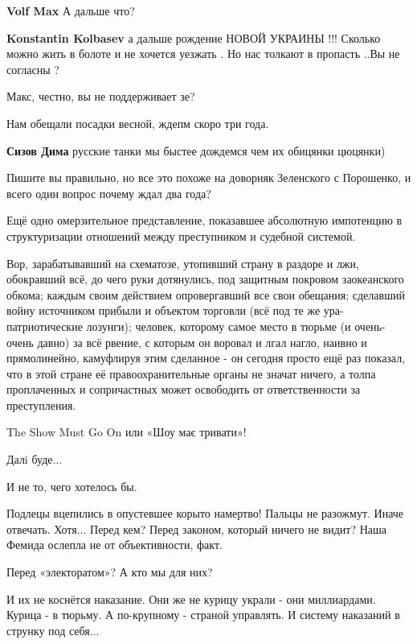 \begin{itemize}
\begin{itemize} %
\textbf{Volf Max} А дальше что?

\textbf{Konstantin Kolbasev} а дальше рождение НОВОЙ УКРАИНЫ !!! Сколько можно жить в болоте и не хочется уезжать . Но нас толкают в пропасть ..Вы не согласны ?
\end{itemize} %

Макс, честно, вы не поддерживает зе?

Нам обещали посадки весной, ждепм скоро три года.

\textbf{Сизов Дима} русские танки мы быстее дождемся чем их обицянки цюцянки)

Пишите вы правильно, но все это похоже на доворняк Зеленского с Порошенко, и
всего один вопрос почему ждал два года?


Ещё одно омерзительное представление, показавшее абсолютную импотенцию в
структуризации отношений между преступником и судебной системой.

Вор, зарабатывавший на схематозе, утопивший страну в раздоре и лжи, обокравший
всё, до чего руки дотянулись, под защитным покровом заокеанского обкома; каждым
своим действием опровергавший все свои обещания; сделавший войну источником
прибыли и объектом торговли (всё под те же ура-патриотические лозунги);
человек, которому самое место в тюрьме (и очень-очень давно) за всё рвение, с
которым он воровал и лгал нагло, наивно и прямолинейно, камуфлируя этим
сделанное - он сегодня просто ещё раз показал, что в этой стране её
правоохранительные органы не значат ничего, а толпа проплаченных и сопричастных
может освободить от ответственности за преступления.

The Show Must Go On или «Шоу має тривати»!

Далi буде...

И не то, чего хотелось бы.

Подлецы вцепились в опустевшее корыто намертво! Пальцы не разожмут. Иначе
отвечать. Хотя... Перед кем? Перед законом, который ничего не видит? Наша Фемида
ослепла не от объективности, факт.

Перед «электоратом»? А кто мы для них?

И их не коснётся наказание. Они же не курицу украли - они миллиардами. Курица -
в тюрьму. А по-крупному - страной управлять. И систему наказаний в струнку под
себя...


\end{itemize}
